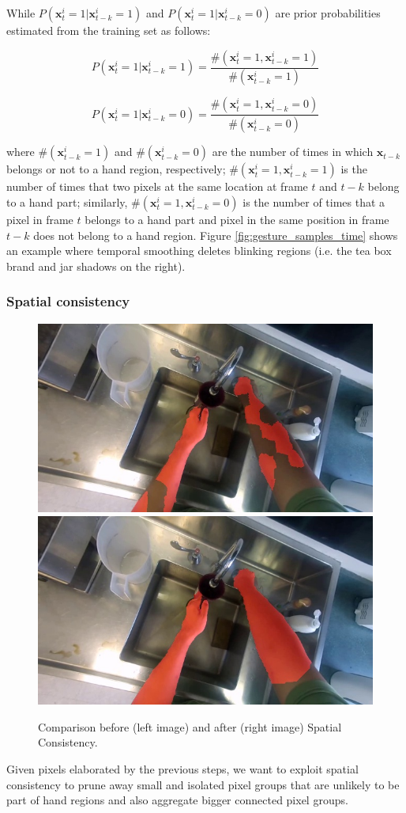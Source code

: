While $P(\mathbf{x}_{t}^{i}=1|\mathbf{x}_{t-k}^{i}=1)$ and $P(\mathbf{x}_{t}^{i}=1|\mathbf{x}_{t-k}^{i}=0)$ are prior probabilities estimated
from the training set as follows:

\[
P(\mathbf{x}_{t}^{i}=1|\mathbf{x}_{t-k}^{i}=1)=\frac{\#(\mathbf{x}_{t}^{i}=1,\mathbf{x}_{t-k}^{i}=1)}{\#(\mathbf{x}_{t-k}^{i}=1)}
\]


\[
P(\mathbf{x}_{t}^{i}=1|\mathbf{x}_{t-k}^{i}=0)=\frac{\#(\mathbf{x}_{t}^{i}=1,\mathbf{x}_{t-k}^{i}=0)}{\#(\mathbf{x}_{t-k}^{i}=0)}
\]


where $\#(\mathbf{x}_{t-k}^{i}=1)$ and $\#(\mathbf{x}_{t-k}^{i}=0)$ are the number of times in which $\mathbf{x}_{t-k}$ belongs or not to
a hand region, respectively; $\#(\mathbf{x}_{t}^{i}=1,\mathbf{x}_{t-k}^{i}=1)$ is the number
of times that two pixels at the same location at frame $t$ and $t-k$ belong to a hand part; 
similarly, $\#(\mathbf{x}_{t}^{i}=1,\mathbf{x}_{t-k}^{i}=0)$
is the number of times that a pixel in frame $t$ belongs to
a hand part and pixel in the same position in frame $t-k$ does not belong
to a hand region.
Figure \ref{fig:gesture_samples_time} shows an example where temporal smoothing deletes blinking regions (i.e. the tea box brand and jar shadows on the right).


\subsubsection{Spatial consistency}
\begin{figure}[tb]
\centering
\includegraphics[width=.45\columnwidth]{./Figures/context-free1.jpg}
\includegraphics[width=.45\columnwidth]{./Figures/context-dependent1.jpg}
\caption{Comparison before (left image) and after (right image) Spatial Consistency.}
\label{fig:gesture_samples_space}
\end{figure}
Given pixels elaborated by the previous steps, we want to exploit spatial consistency to prune away small and isolated pixel groups that are unlikely to be part of hand regions and also aggregate bigger connected pixel groups. 

